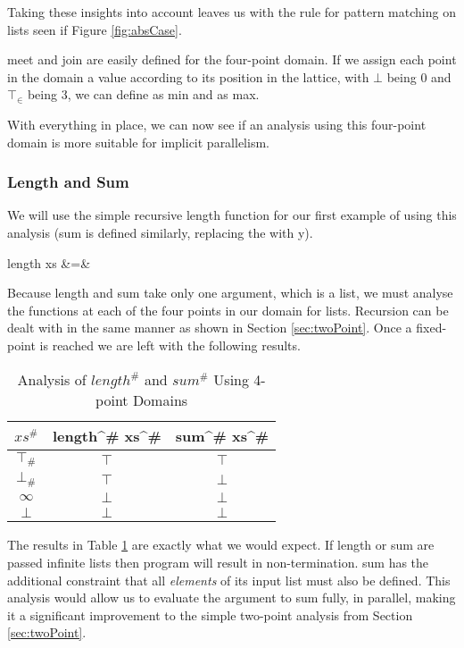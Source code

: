 Taking these insights into account leaves us with the rule for
pattern matching on lists seen if Figure \ref{fig:absCase}.

\<meet\> and \<join\> are easily defined for the four-point domain. If we
assign each point in the domain a value according to its position in the lattice,
with $\bot$ being $0$ and $\top_{\in}$ being $3$, we can define \meet as \<min\>
and \join as \<max\>.

With everything in place, we can now see if an analysis using this four-point
domain is more suitable for implicit parallelism.

\subsubsection{Length and Sum}

We will use the simple recursive \<length\> function for our first example of
using this analysis (\<sum\> is defined similarly, replacing the \> with
\<y\>).

\begin{haskell*}
length xs &=& 
\end{haskell*}

Because \<length\> and \<sum\> take only one argument, which is a list, we must
analyse the functions at each of the four points in our domain for lists.
Recursion can be dealt with in the same manner as shown in Section
\ref{sec:twoPoint}. Once a fixed-point is reached we are left with the
following results.

\begin{table}[h!]
\centering
\caption{Analysis of \(length^{\#}\) and \(sum^{\#}\) Using 4-point Domains}
\vspace{10pt}
\begin{tabular}{c || c c}
    $xs^{\#}$ & \<length^{\#} xs^{\#}\> & \<sum^{\#} xs^{\#}\> \\
    \hline
    $\top_{\#}$ & $\top$                & $\top$ \\
    $\bot_{\#}$ & $\top$                & $\bot$ \\
    $\infty$ & $\bot$                   & $\bot$ \\
    $\bot$ & $\bot$                     & $\bot$
\end{tabular}    
\label{tab:lengthSum}
\end{table}

The results in Table \ref{tab:lengthSum} are exactly what we would expect. If
\<length\> or \<sum\> are passed infinite lists then program will result in
non-termination. \<sum\> has the additional constraint that all \emph{elements}
of its input list must also be defined. This analysis would allow us to
evaluate the argument to \<sum\> fully, in parallel, making it a significant
improvement to the simple two-point analysis from Section \ref{sec:twoPoint}.

